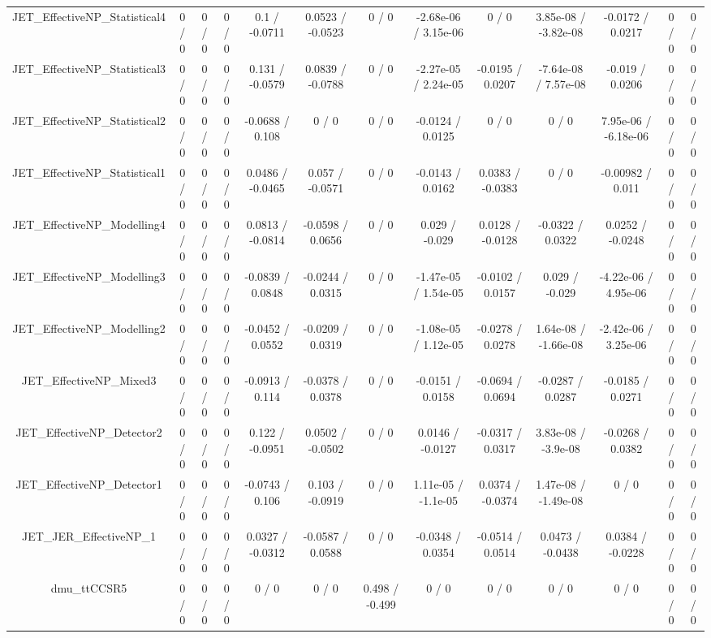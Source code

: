 \documentclass[10pt]{article}
\begin{document}
\begin{table}[htbp]
\begin{center}
\begin{tabular}{|c|c|c|c|c|c|c|c|c|c|c|c|c|}
  JET_EffectiveNP_Statistical4 & 0 / 0 & 0 / 0 & 0 / 0 & 0.1 / -0.0711 & 0.0523 / -0.0523 & 0 / 0 & -2.68e-06 / 3.15e-06 & 0 / 0 & 3.85e-08 / -3.82e-08 & -0.0172 / 0.0217 & 0 / 0 & 0 / 0 \\ 
  JET_EffectiveNP_Statistical3 & 0 / 0 & 0 / 0 & 0 / 0 & 0.131 / -0.0579 & 0.0839 / -0.0788 & 0 / 0 & -2.27e-05 / 2.24e-05 & -0.0195 / 0.0207 & -7.64e-08 / 7.57e-08 & -0.019 / 0.0206 & 0 / 0 & 0 / 0 \\ 
  JET_EffectiveNP_Statistical2 & 0 / 0 & 0 / 0 & 0 / 0 & -0.0688 / 0.108 & 0 / 0 & 0 / 0 & -0.0124 / 0.0125 & 0 / 0 & 0 / 0 & 7.95e-06 / -6.18e-06 & 0 / 0 & 0 / 0 \\ 
  JET_EffectiveNP_Statistical1 & 0 / 0 & 0 / 0 & 0 / 0 & 0.0486 / -0.0465 & 0.057 / -0.0571 & 0 / 0 & -0.0143 / 0.0162 & 0.0383 / -0.0383 & 0 / 0 & -0.00982 / 0.011 & 0 / 0 & 0 / 0 \\ 
  JET_EffectiveNP_Modelling4 & 0 / 0 & 0 / 0 & 0 / 0 & 0.0813 / -0.0814 & -0.0598 / 0.0656 & 0 / 0 & 0.029 / -0.029 & 0.0128 / -0.0128 & -0.0322 / 0.0322 & 0.0252 / -0.0248 & 0 / 0 & 0 / 0 \\ 
  JET_EffectiveNP_Modelling3 & 0 / 0 & 0 / 0 & 0 / 0 & -0.0839 / 0.0848 & -0.0244 / 0.0315 & 0 / 0 & -1.47e-05 / 1.54e-05 & -0.0102 / 0.0157 & 0.029 / -0.029 & -4.22e-06 / 4.95e-06 & 0 / 0 & 0 / 0 \\ 
  JET_EffectiveNP_Modelling2 & 0 / 0 & 0 / 0 & 0 / 0 & -0.0452 / 0.0552 & -0.0209 / 0.0319 & 0 / 0 & -1.08e-05 / 1.12e-05 & -0.0278 / 0.0278 & 1.64e-08 / -1.66e-08 & -2.42e-06 / 3.25e-06 & 0 / 0 & 0 / 0 \\ 
  JET_EffectiveNP_Mixed3 & 0 / 0 & 0 / 0 & 0 / 0 & -0.0913 / 0.114 & -0.0378 / 0.0378 & 0 / 0 & -0.0151 / 0.0158 & -0.0694 / 0.0694 & -0.0287 / 0.0287 & -0.0185 / 0.0271 & 0 / 0 & 0 / 0 \\ 
  JET_EffectiveNP_Detector2 & 0 / 0 & 0 / 0 & 0 / 0 & 0.122 / -0.0951 & 0.0502 / -0.0502 & 0 / 0 & 0.0146 / -0.0127 & -0.0317 / 0.0317 & 3.83e-08 / -3.9e-08 & -0.0268 / 0.0382 & 0 / 0 & 0 / 0 \\ 
  JET_EffectiveNP_Detector1 & 0 / 0 & 0 / 0 & 0 / 0 & -0.0743 / 0.106 & 0.103 / -0.0919 & 0 / 0 & 1.11e-05 / -1.1e-05 & 0.0374 / -0.0374 & 1.47e-08 / -1.49e-08 & 0 / 0 & 0 / 0 & 0 / 0 \\ 
  JET_JER_EffectiveNP_1 & 0 / 0 & 0 / 0 & 0 / 0 & 0.0327 / -0.0312 & -0.0587 / 0.0588 & 0 / 0 & -0.0348 / 0.0354 & -0.0514 / 0.0514 & 0.0473 / -0.0438 & 0.0384 / -0.0228 & 0 / 0 & 0 / 0 \\ 
  dmu_ttCCSR5 & 0 / 0 & 0 / 0 & 0 / 0 & 0 / 0 & 0 / 0 & 0.498 / -0.499 & 0 / 0 & 0 / 0 & 0 / 0 & 0 / 0 & 0 / 0 & 0 / 0 \\ 

\end{tabular}
\end{center}
\end{table}
\end{document}
